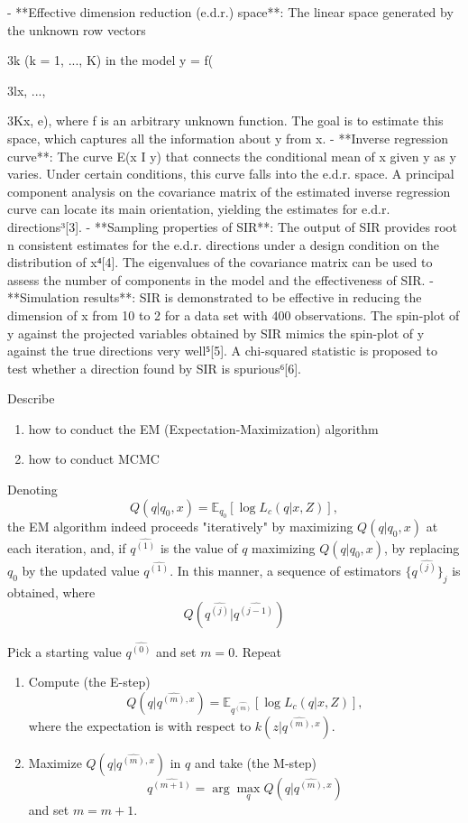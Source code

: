 \documentclass[UTF8,a4paper,10pt]{article}
\begin{document}
- **Effective dimension reduction (e.d.r.) space**: The linear space generated by the unknown row vectors {3k (k = 1, ..., K) in the model y = f({3lx, ..., {3Kx, e), where f is an arbitrary unknown function. The goal is to estimate this space, which captures all the information about y from x.
- **Inverse regression curve**: The curve E(x I y) that connects the conditional mean of x given y as y varies. Under certain conditions, this curve falls into the e.d.r. space. A principal component analysis on the covariance matrix of the estimated inverse regression curve can locate its main orientation, yielding the estimates for e.d.r. directions³[3].
- **Sampling properties of SIR**: The output of SIR provides root n consistent estimates for the e.d.r. directions under a design condition on the distribution of x⁴[4]. The eigenvalues of the covariance matrix can be used to assess the number of components in the model and the effectiveness of SIR.
- **Simulation results**: SIR is demonstrated to be effective in reducing the dimension of x from 10 to 2 for a data set with 400 observations. The spin-plot of y against the projected variables obtained by SIR mimics the spin-plot of y against the true directions very well⁵[5]. A chi-squared statistic is proposed to test whether a direction found by SIR is spurious⁶[6].


\pagebreak
\begin{Problem}[]{}
  Describe
  \begin{enumerate}
    \item how to conduct the EM (Expectation-Maximization) algorithm
    \item how to conduct  MCMC
  \end{enumerate}
    
  \end{Problem}
  Denoting
  \[ Q(q|q_0, x) = \mathbb{E}_{q_0} \left[ \log L_c(q|x,Z) \right], \]
  the EM algorithm indeed proceeds "iteratively" by maximizing \(Q(q|q_0, x)\) at each iteration, and, if \(q^{\hat{(1)}}\) is the value of \(q\) maximizing \(Q(q|q_0, x)\), by replacing \(q_0\) by the updated value \(q^{\hat{(1)}}\). In this manner, a sequence of estimators \(\{q^{\hat{(j)}}\}_j\) is obtained, where
  \[ Q(q^{\hat{(j)}}|q^{\hat{(j-1)}}) \]

  Pick a starting value \(q^{\hat{(0)}}\) and set \(m = 0\).
Repeat
\begin{enumerate}
  \item Compute (the E-step) \[ Q(q|q^{\hat{(m)}, x}) = \mathbb{E}_{q^{\hat{(m)}}} \left[ \log L_c(q|x,Z) \right], \]where the expectation is with respect to \(k(z|q^{\hat{(m)}, x})\).
  \item Maximize \(Q(q|q^{\hat{(m)}, x})\) in \(q\) and take (the M-step)   \[ q^{\hat{(m+1)}} = \arg\max_q Q(q|q^{\hat{(m)}, x}) \] and set \(m = m+1\).
\end{enumerate}

}}}
\end{document}
